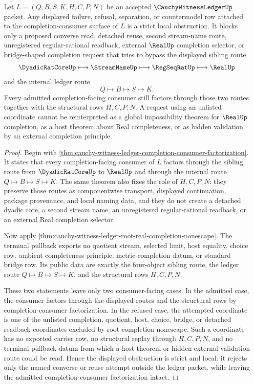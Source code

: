 \begin{corollary}
\label{cor:cauchy-witness-ledger-completion-consumer-strict-local-obstruction}
Let $L=(Q,B,S,K,H,C,P,N)$ be an accepted $\CauchyWitnessLedgerUp$ packet. Any displayed failure, refusal, separation, or countermodel row attached to the completion-consumer surface of $L$ is a strict local obstruction. It blocks only a proposed converse read, detached reuse, second stream-name route, unregistered regular-rational readback, external $\RealUp$ completion selector, or bridge-shaped completion request that tries to bypass the displayed sibling route
$$
\DyadicRatCoreUp \longmapsto \StreamNameUp \longmapsto \RegSeqRatUp \longmapsto \RealUp
$$
and the internal ledger route
$$
Q \longmapsto B \longmapsto S \longmapsto K.
$$
Every admitted completion-facing consumer still factors through those two routes together with the structural rows $H,C,P,N$. A request using an unlisted coordinate cannot be reinterpreted as a global impossibility theorem for $\RealUp$ completion, as a host theorem about Real completeness, or as hidden validation by an external completion principle.
\end{corollary}
\begin{proof}
Begin with \autoref{thm:cauchy-witness-ledger-completion-consumer-factorization}. It states that every completion-facing consumer of $L$ factors through the sibling route from $\DyadicRatCoreUp$ to $\RealUp$ and through the internal route $Q \longmapsto B \longmapsto S \longmapsto K$. The same theorem also fixes the role of $H,C,P,N$: they preserve those routes as componentwise transport, displayed continuation, package provenance, and local naming data, and they do not create a detached dyadic core, a second stream name, an unregistered regular-rational readback, or an external Real completion selector.

Now apply \autoref{thm:cauchy-witness-ledger-root-real-completion-nonescape}. The terminal pullback exports no quotient stream, selected limit, host equality, choice row, ambient completeness principle, metric-completion datum, or standard bridge row. Its public data are exactly the four-object sibling route, the ledger route $Q \longmapsto B \longmapsto S \longmapsto K$, and the structural rows $H,C,P,N$.

These two statements leave only two consumer-facing cases. In the admitted case, the consumer factors through the displayed routes and the structural rows by completion-consumer factorization. In the refused case, the attempted coordinate is one of the unlisted completion, quotient, host, choice, bridge, or detached readback coordinates excluded by root completion nonescape. Such a coordinate has no exported carrier row, no structural replay through $H,C,P,N$, and no terminal pullback datum from which a host theorem or hidden external validation route could be read. Hence the displayed obstruction is strict and local: it rejects only the named converse or reuse attempt outside the ledger packet, while leaving the admitted completion-consumer factorization intact.
\end{proof}
